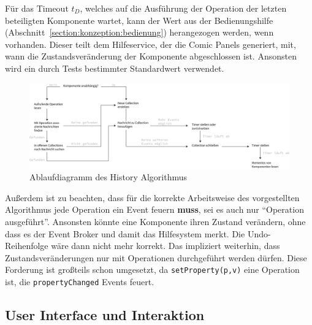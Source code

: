 \documentclass[
	headsepline,
	footsepline,
	fontsize=12pt,
	bibliography=totoc
]{scrbook}
\begin{document}
Für das Timeout $t_D$, welches auf die Ausführung der Operation der letzten beteiligten Komponente wartet, kann der Wert aus der Bedienungshilfe (Abschnitt~\ref{section:konzeption:bedienung}) herangezogen werden, wenn vorhanden. Dieser teilt dem Hilfeservice, der die Comic Panels generiert, mit, wann die Zustandsveränderung der Komponente abgeschlossen ist. Ansonsten wird ein durch Tests bestimmter Standardwert verwendet.

\begin{figure}[htbp]
   \centering
   \includegraphics[width=\textwidth]{images/konzeption-dependency-graph-diagram.png}
   \caption{Ablaufdiagramm des History Algorithmus}
   \label{figure:dependency-graph-diagram}
\end{figure}

Außerdem ist zu beachten, dass für die korrekte Arbeitsweise des vorgestellten Algorithmus jede Operation ein Event feuern \textbf{muss}, sei es auch nur \enquote{Operation ausgeführt}. Ansonsten könnte eine Komponente ihren Zustand verändern, ohne dass es der Event Broker und damit das Hilfesystem merkt. Die Undo-Reihenfolge wäre dann nicht mehr korrekt. Das impliziert weiterhin, dass Zustandsveränderungen nur mit Operationen durchgeführt werden dürfen. Diese Forderung ist großteils schon umgesetzt, da \texttt{setProperty(p,v)} eine Operation ist, die \texttt{propertyChanged} Events feuert.

\subsection{User Interface und Interaktion}
\label{section:konzeption:history:ui}

\end{document}
